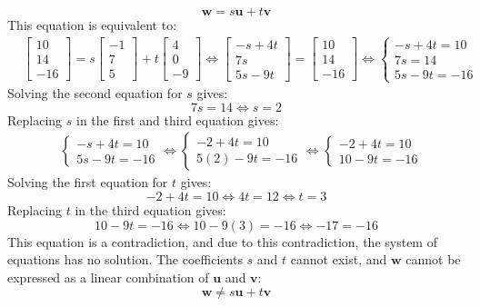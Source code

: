 \documentclass{article}
\begin{document}
\begin{itemize}
\[\mathbf{w} = s\mathbf{u} + t\mathbf{v}\]
This equation is equivalent to: 
\begin{align*}
& \begin{bmatrix} 10 \\ 14 \\ -16 \end{bmatrix} = s\begin{bmatrix} -1 \\ 7 \\ 5 \end{bmatrix} + t\begin{bmatrix} 4 \\ 0 \\ -9 \end{bmatrix}  
\iff \begin{bmatrix} -s + 4t \\ 7s \\ 5s - 9t \end{bmatrix} = \begin{bmatrix} 10 \\ 14 \\ -16 \end{bmatrix}  
\iff \left\{\begin{array}{c} -s + 4t = 10 \\ 7s = 14 \\ 5s - 9t = -16 \end{array}\right.
\end{align*}
Solving the second equation for \(s\) gives:
\[7s = 14 \iff s = 2\]
Replacing \(s\) in the first and third equation gives:
\begin{align*}
& \left\{\begin{array}{c} -s + 4t = 10 \\ 5s - 9t = -16 \end{array}\right. 
\iff \left\{\begin{array}{c} -2 + 4t = 10 \\ 5(2) - 9t = -16 \end{array}\right.   
\iff \left\{\begin{array}{c} -2 + 4t = 10 \\ 10 - 9t = -16 \end{array}\right.   
\end{align*}
Solving the first equation for \(t\) gives:
\[-2 + 4t = 10 \iff 4t = 12 \iff t = 3\]
Replacing \(t\) in the third equation gives:
\[10 - 9t = -16 \iff 10 - 9(3) = -16 \iff -17 = -16\]
This equation is a contradiction, and due to this contradiction, the system of equations has no solution. The coefficients \(s\) and \(t\) cannot exist, and \(\mathbf{w}\) cannot be expressed as a linear combination of \(\mathbf{u}\) and \(\mathbf{v}\):
\[\mathbf{w} \neq s\mathbf{u} + t\mathbf{v}\]
\end{itemize}
\end{document}
